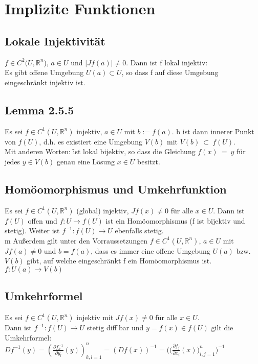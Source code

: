\section{Implizite Funktionen}
\subsection{Lokale Injektivität}
$f \in C^2(U,\mathbb{R}^n$), $a \in U$ und $\vert Jf(a)\vert \neq 0$. Dann ist f lokal injektiv: \\
Es gibt offene Umgebung $U(a) \subset U$, so dass f auf diese Umgebung eingeschränkt injektiv ist.

\subsection{Lemma 2.5.5}
Es sei $f \in C^1(U,\mathbb{R}^n)$ injektiv, $a \in U$ mit $b := f(a)$. b ist dann innerer Punkt von $f(U)$, d.h. es existiert eine Umgebung $V(b)$ mit $V(b) \ \subset  \ f(U)$. \\
Mit anderen Worten: \f ist lokal bijektiv, so dass die Gleichung $f(x) \ = \ y$ für jedes $y \in V(b)$ genau eine Lösung $x \in U$ besitzt.


\subsection{Homöomorphismus und Umkehrfunktion}
Es sei $f \in C^1(U,\mathbb{R}^n)$ (global) injektiv, $Jf(x)\neq 0$ für alle $x \in U$. Dann ist $f(U)$ offen und $f: U \rightarrow f(U)$ ist ein Homöomorphismus (f ist bijektiv und stetig). Weiter ist $f^{-1}: f(U) \rightarrow U$ ebenfalls stetig.
\\m
Außerdem gilt unter den Vorraussetzungen $f \in C^1(U,\mathbb{R}^n)$, $a \in U$ mit $Jf(a)\neq 0$ und $b=f(a)$, dass es immer eine offene Umgebung $U(a)$ bzw. $V(b)$ gibt, auf welche eingeschränkt f ein Homöomorphismus ist.\\
$f: U(a) \rightarrow V(b)$

\subsection{Umkehrformel}
Es sei $f \in C^1(U,\mathbb{R}^n)$ injektiv mit $Jf(x)\neq 0$ für alle $x \in U$.\\
Dann ist $f^{-1}: f(U)\rightarrow U$ stetig diff'bar und $y=f(x) \in f(U)$ gilt die Umkehrformel:\\
$Df^{-1}(y) = \left(\frac{\partial f^{-1}_k}{\partial y_l}(y)\right)_{k,l=1}^{n} = (Df(x))^{-1} = {\big (}{\big(}\frac{\partial f_j}{\partial x_i}(x){\big )}_{i,j=1}^{n}{\big )}^{-1}$

